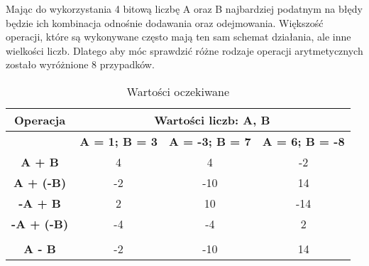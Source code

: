 \documentclass[12pt, a4paper, onside, polish]{article}				%
\begin{document}
Mając do wykorzystania 4 bitową liczbę A oraz B najbardziej podatnym na błędy będzie ich kombinacja odnośnie dodawania oraz odejmowania. Większość operacji, które są wykonywane często mają ten sam schemat działania, ale inne wielkości liczb. Dlatego aby móc sprawdzić różne rodzaje operacji arytmetycznych zostało wyróżnione 8 przypadków.  


\begin{table}[hbt!]
\caption{Wartości oczekiwane}
\centering
\begin{tabular}{|c|ccc|}
\hline
\rowcolor[HTML]{9B9B9B} 
Operacja                                   & \multicolumn{3}{c|}{\cellcolor[HTML]{9B9B9B}Wartości liczb: A, B}                                                                                                                         \\ \hline
                                           & \multicolumn{1}{c|}{\cellcolor[HTML]{EFEFEF}\textbf{A = 1; B = 3}} & \multicolumn{1}{c|}{\cellcolor[HTML]{EFEFEF}\textbf{A = -3; B = 7}} & \cellcolor[HTML]{EFEFEF}\textbf{A = 6; B = -8} \\ \hline
\cellcolor[HTML]{EFEFEF}\textbf{A + B}     & \multicolumn{1}{c|}{4}                                             & \multicolumn{1}{c|}{4}                                              & -2                                             \\ \hline
\cellcolor[HTML]{EFEFEF}\textbf{A + (-B)}  & \multicolumn{1}{c|}{-2}                                            & \multicolumn{1}{c|}{-10}                                            & 14                                             \\ \hline
\cellcolor[HTML]{EFEFEF}\textbf{-A + B}    & \multicolumn{1}{c|}{2}                                             & \multicolumn{1}{c|}{10}                                             & -14                                            \\ \hline
\cellcolor[HTML]{EFEFEF}\textbf{-A + (-B)} & \multicolumn{1}{c|}{-4}                                            & \multicolumn{1}{c|}{-4}                                             & 2                                              \\ \hline
\cellcolor[HTML]{EFEFEF}\textbf{}          & \multicolumn{1}{c|}{}                                              & \multicolumn{1}{c|}{}                                               &                                                \\ \hline
\cellcolor[HTML]{EFEFEF}\textbf{A - B}     & \multicolumn{1}{c|}{-2}                                            & \multicolumn{1}{c|}{-10}                                            & 14                                             \\ \hline

\end{tabular}
\end{table}
\end{document}
